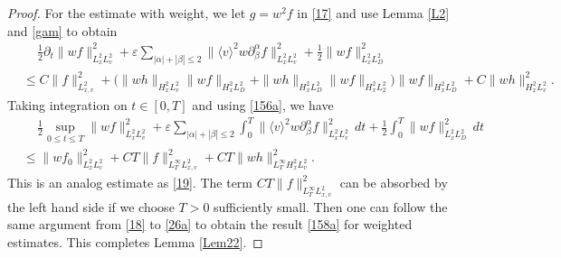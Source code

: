\documentclass[reqno,a4paper]{amsart}
\numberwithin{equation}{section}
\newcommand{\1}{\mathbf{1}}
\newcommand{\ve}{\varepsilon}
\newcommand{\<}{\langle}
\renewcommand{\>}{\rangle}
\begin{document}
\begin{proof}
For the estimate with weight, we let $g=w^2f$ in \eqref{17} and use Lemma \ref{L2} and \ref{gam} to obtain 
\begin{align*}
	&\quad\,\frac{1}{2}\partial_t\|wf\|^2_{L^2_xL^2_v} + {\ve}\sum_{|\alpha|+|\beta|\le 2}\|\<v\>^{2} w\partial^\alpha_\beta f\|^2_{L^2_xL^2_v} + \frac{1}{2}\|wf\|_{L^2_xL^2_D}^2\\
	&\le C\|f\|^2_{L^2_{x,v}} + \big(\|wh\|_{H^2_xL^2_v}\|wf\|_{H^2_xL^2_D}+\|wh\|_{H^2_xL^2_D}\|wf\|_{H^2_xL^2_2}\big)\|wf\|_{H^2_xL^2_D}+C\|wh\|^2_{H^2_xL^2_v}. 
\end{align*}
Taking integration on $t\in[0,T]$ and using \eqref{156a}, we have 
\begin{align*}
	&\quad\,\frac{1}{2}\sup_{0\le t\le T}\|wf\|^2_{L^2_xL^2_v} + {\ve}\sum_{|\alpha|+|\beta|\le 2}\int^T_0\|\<v\>^{2} w\partial^\alpha_\beta f\|^2_{L^2_xL^2_v}\,dt + \frac{1}{2}\int^T_0\|wf\|_{L^2_xL^2_D}^2\,dt\\
	&\le \|wf_0\|^2_{L^2_xL^2_v}+CT\|f\|^2_{L^\infty_TL^2_{x,v}} + CT\|wh\|^2_{L^\infty_TH^2_xL^2_v}. 
\end{align*}
This is an analog estimate as \eqref{19}. The term $CT\|f\|^2_{L^\infty_TL^2_{x,v}}$ can be absorbed by the left hand side if we choose $T>0$ sufficiently small. Then one can follow the same argument from \eqref{18} to \eqref{26a} to obtain the result \eqref{158a} for weighted estimates. 
This completes Lemma \ref{Lem22}. 

\end{proof}
\end{document}
